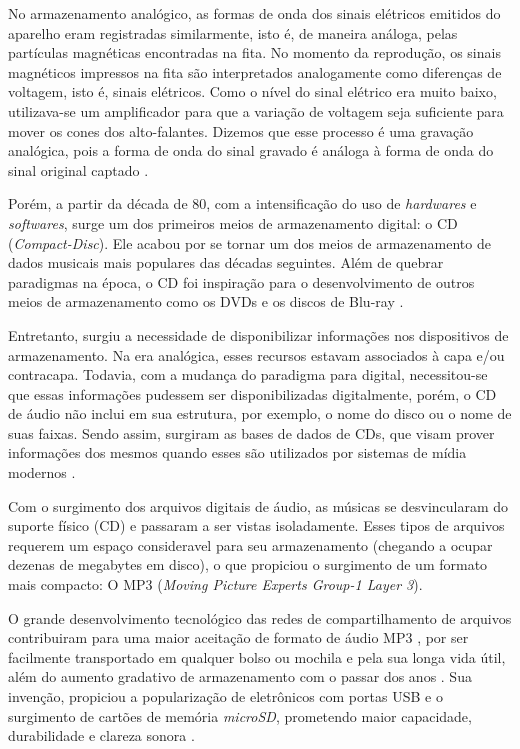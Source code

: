 No armazenamento analógico, as formas de onda dos sinais elétricos emitidos do aparelho eram registradas similarmente, isto é, de maneira análoga, pelas partículas magnéticas encontradas na fita. No momento da reprodução, os sinais magnéticos impressos na fita são interpretados analogamente como diferenças de voltagem, isto é, sinais elétricos. Como o nível do sinal elétrico era muito baixo, utilizava-se um amplificador para que a variação de voltagem seja suficiente para mover os cones dos alto-falantes. Dizemos que esse processo é uma gravação analógica, pois a forma de onda do sinal gravado é análoga à forma de onda do sinal original captado \cite{paulozuben2004}.

Porém, a partir da década de 80, com a intensificação do uso de \textit{hardwares} e \textit{softwares}, surge um dos primeiros meios de armazenamento digital: o CD (\textit{Compact-Disc}). Ele acabou por se tornar um dos meios de armazenamento de dados musicais mais populares das décadas seguintes. Além de quebrar paradigmas na época, o CD foi inspiração para o desenvolvimento de outros meios de armazenamento como os DVDs e os discos de Blu-ray \cite{marchi2005}.

Entretanto, surgiu a necessidade de disponibilizar informações nos dispositivos de armazenamento. Na era analógica, esses recursos estavam associados à capa e/ou contracapa. Todavia, com a mudança do paradigma para digital, necessitou-se que essas informações pudessem ser disponibilizadas digitalmente, porém, o CD de áudio não inclui em sua estrutura, por exemplo, o nome do disco ou o nome de suas faixas. Sendo assim, surgiram as bases de dados de CDs, que visam prover informações dos mesmos quando esses são utilizados por sistemas de mídia modernos \cite{andrade&crispim2008}.

Com o surgimento dos arquivos digitais de áudio, as músicas se desvincularam do suporte físico (CD) e passaram a ser vistas isoladamente. Esses tipos de arquivos requerem um espaço consideravel para seu armazenamento (chegando a ocupar dezenas de megabytes em disco), o que propiciou o surgimento de um formato mais compacto: O MP3 (\textit{Moving Picture Experts Group-1 Layer 3}).

O grande desenvolvimento tecnológico das redes de compartilhamento de arquivos contribuiram para uma maior aceitação de formato de áudio MP3 \cite{andrade&crispim2008}, por ser facilmente transportado em qualquer bolso ou mochila e pela sua longa vida útil, além do aumento gradativo de armazenamento com o passar dos anos \cite{marchi2005}. Sua invenção, propiciou a popularização de eletrônicos com portas USB e o surgimento de cartões de memória \textit{microSD}, prometendo maior capacidade, durabilidade e clareza sonora \cite{marchi2005}.

